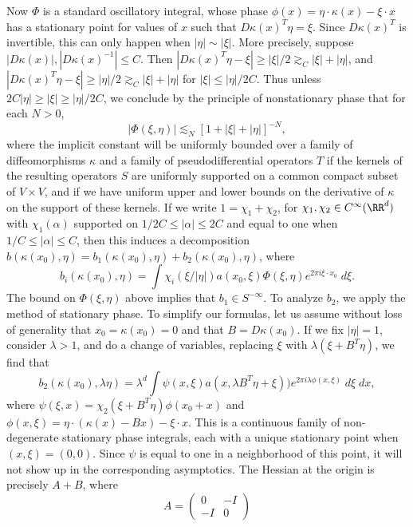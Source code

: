 %
Now $\Phi$ is a standard oscillatory integral, whose phase $\phi(x) = \eta \cdot \kappa(x) - \xi \cdot x$ has a stationary point for values of $x$ such that $D\kappa(x)^T \eta = \xi$. Since $D\kappa(x)^T$ is invertible, this can only happen when $|\eta| \sim |\xi|$. More precisely, suppose $|D\kappa(x)|, |D\kappa(x)^{-1}| \leq C$. Then $|D\kappa(x)^T \eta - \xi| \geq |\xi|/2 \gtrsim_C |\xi| + |\eta|$, and $|D\kappa(x)^T \eta - \xi| \geq |\eta|/2 \gtrsim_C |\xi| + |\eta|$ for $|\xi| \leq |\eta|/2C$. Thus unless $2C|\eta| \geq |\xi| \geq |\eta|/2C$, we conclude by the principle of nonstationary phase that for each $N > 0$,
%
\[ |\Phi(\xi,\eta)| \lesssim_N [1 + |\xi| + |\eta|]^{-N}, \]
%
where the implicit constant will be uniformly bounded over a family of diffeomorphisms $\kappa$ and a family of pseudodifferential operators $T$ if the kernels of the resulting operators $S$ are uniformly supported on a common compact subset of $V \times V$, and if we have uniform upper and lower bounds on the derivative of $\kappa$ on the support of these kernels. If we write $1 = \chi_1 + \chi_2$, for $\chi_1,\chi_2 \in C^\infty(\RR^d)$ with $\chi_1(\alpha)$ supported on $1/2C \leq |\alpha| \leq 2C$ and equal to one when $1/C \leq |\alpha| \leq C$, then this induces a decomposition $b(\kappa(x_0),\eta) = b_1(\kappa(x_0),\eta) + b_2(\kappa(x_0),\eta)$, where
%
\[ b_i(\kappa(x_0),\eta) = \int \chi_i(\xi/|\eta|) a(x_0,\xi) \Phi(\xi,\eta) e^{2 \pi i \xi \cdot x_0}\; d\xi. \]
%
The bound on $\Phi(\xi,\eta)$ above implies that $b_1 \in S^{-\infty}$. To analyze $b_2$, we apply the method of stationary phase. To simplify our formulas, let us assume without loss of generality that $x_0 = \kappa(x_0) = 0$ and that $B = D\kappa(x_0)$. If we fix $|\eta| = 1$, consider $\lambda > 1$, and do a change of variables, replacing $\xi$ with $\lambda (\xi + B^T \eta)$, we find that
%
\[ b_2(\kappa(x_0),\lambda \eta) = \lambda^d \int \psi(x,\xi) a(x,\lambda B^T \eta + \xi)) e^{2 \pi i \lambda \phi(x,\xi)}\; d\xi\; dx, \]
%
where $\psi(\xi,x) = \chi_2(\xi + B^T \eta) \phi(x_0 + x)$ and $\phi(x,\xi) = \eta \cdot (\kappa(x) - Bx) - \xi \cdot x$. This is a continuous family of non-degenerate stationary phase integrals, each with a unique stationary point when $(x,\xi) = (0,0)$. Since $\psi$ is equal to one in a neighborhood of this point, it will not show up in the corresponding asymptotics. The Hessian at the origin is precisely $A + B$, where
%
\[ A = \begin{pmatrix} 0 & -I \\ -I & 0 \end{pmatrix} \]
